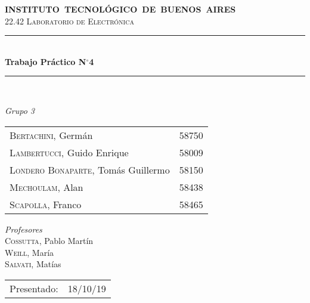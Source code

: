 \begin{titlepage}

\newcommand{\HRule}{\rule{\linewidth}{0.5mm}}
\center
\mbox{\textsc{\large \bfseries {INSTITUTO TECNOLÓGICO DE BUENOS AIRES}}}\\[1cm]
\textsc{\Large 22.42 Laboratorio de Electrónica}\\[0.5cm]


\HRule \\[0.6cm]
{ \Huge \bfseries Trabajo Práctico N$^{\circ}$4}\\[0.4cm] 
\HRule \\[1.5cm]


{\large

\emph{Grupo 3}\\
\vspace{3px}

\begin{tabular}{lr} 	
\textsc{Bertachini}, Germán  & 58750 \\ 	
\textsc{Lambertucci}, Guido Enrique  & 58009 \\
\textsc{Londero Bonaparte}, Tomás Guillermo  & 58150 \\
\textsc{Mechoulam}, Alan  &  58438\\
\textsc{Scapolla}, Franco & 58465
\end{tabular}

\vspace{20px}

\emph{Profesores}\\
\vspace{3px}
\textsc{Cossutta}, Pablo Martín\\
\textsc{Weill}, María\\
\textsc{Salvati}, Matías\\	
\vspace{100px}

\begin{tabular}{ll}

Presentado: & 18/10/19\\

\end{tabular}

}

\vfill

\end{titlepage}

